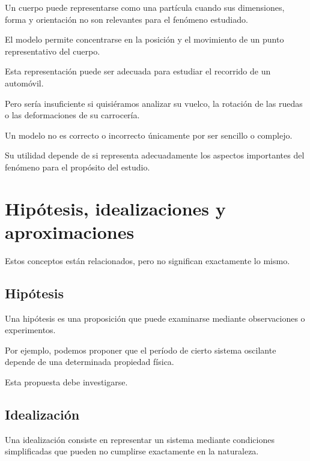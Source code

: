 \begin{modelo}

Un cuerpo puede representarse como una partícula
cuando sus dimensiones, forma y orientación
no son relevantes para el fenómeno estudiado.

El modelo permite concentrarse en la posición
y el movimiento de un punto representativo
del cuerpo.

\end{modelo}

Esta representación puede ser adecuada para
estudiar el recorrido de un automóvil.

Pero sería insuficiente si quisiéramos analizar
su vuelco, la rotación de las ruedas
o las deformaciones de su carrocería.

\begin{idea}

Un modelo no es correcto o incorrecto
únicamente por ser sencillo o complejo.

Su utilidad depende de si representa adecuadamente
los aspectos importantes del fenómeno
para el propósito del estudio.

\end{idea}


\section{Hipótesis, idealizaciones y aproximaciones}

Estos conceptos están relacionados,
pero no significan exactamente lo mismo.

\subsection{Hipótesis}

Una hipótesis es una proposición que puede
examinarse mediante observaciones o experimentos.

Por ejemplo, podemos proponer que el período
de cierto sistema oscilante depende
de una determinada propiedad física.

Esta propuesta debe investigarse.

\subsection{Idealización}

Una idealización consiste en representar
un sistema mediante condiciones simplificadas
que pueden no cumplirse exactamente
en la naturaleza.

